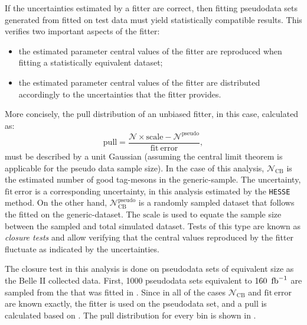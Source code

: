If the uncertainties estimated by a fitter are correct, then fitting pseudodata sets generated from  fitted on test data must yield statistically compatible results.
This verifies two important aspects of the fitter:
\begin{itemize}
    \item the estimated parameter central values of the fitter are reproduced when fitting a statistically equivalent dataset;
    \item the estimated parameter central values of the fitter are distributed accordingly to the uncertainties that the fitter provides.
\end{itemize}

More concisely, the pull distribution of an unbiased fitter, in this case, calculated as:
\begin{equation}\label{eq:toy_pull}
    \mathrm{pull} = \frac{\mathcal{N}\times \mathrm{scale} - \mathcal{N}^{\mathrm{pseudo}}}{\mathrm{fit~error}},
\end{equation}
must be described by a unit Gaussian (assuming the central limit theorem is applicable for the pseudo data sample size).
In the case of this analysis, $\mathcal{N}_{\mathrm{CB}}$ is the estimated number of good tag-\B mesons in the generic-\MC sample.
The uncertainty, $\mathrm{fit~error}$ is a corresponding uncertainty, in this analysis estimated by the \texttt{HESSE} method.
On the other hand, $\mathcal{N}^{\mathrm{pseudo}}_{\mathrm{CB}}$ is a randomly sampled dataset that follows the  fitted on the generic-\MC dataset.
The $\mathrm{scale}$ is used to equate the sample size between the sampled and total simulated dataset.
Tests of this type are known as \textit{closure tests} and allow verifying that the central values reproduced by the fitter fluctuate as indicated by the \PDF uncertainties.

The closure test in this analysis is done on pseudodata sets of equivalent size as the Belle II collected data.
First, 1000 pseudodata sets equivalent to $\mathrm{160~\mbox{\,fb}^{-1}}$ are sampled from the \PDF that was fitted in .
Since in all of the cases $\mathcal{N}_{\mathrm{CB}}$ and $\mathrm{fit~error}$ are known exactly, the \Mbc fitter is used on the pseudodata set, and a $\mathrm{pull}$ is calculated based on .
The pull distribution for every \EB bin is shown in .

